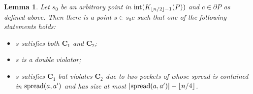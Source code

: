 \documentclass[12pt]{article}
\newcommand{\spread}{{\rm spread}}
\newcommand{\floor}[1]{{\lfloor #1 \rfloor}}
\newtheorem{lemma}{Lemma}
\begin{document}
\begin{lemma}\label{lem:line}
Let $s_0$ be an arbitrary point in ${\rm int}(K_{\floor{n/2}-1}(P))$ and
$c \in \partial P$ as defined above.
Then there is a point $s\in s_0c$ such that one of the following statements holds:
\begin{itemize}
\item[$\bullet$] $s$ satisfies both $\mathbf{C}_1$ and $\mathbf{C}_2$;
\item[$\bullet$] $s$ is a double violator;
\item[$\bullet$] $s$ satisfies $\mathbf{C}_1$ but violates $\mathbf{C}_2$ due
                  to two pockets of whose spread is contained in $\spread(a,a')$
                  and has size at most $|\spread(a,a')|-\floor{n/4}$.
\end{itemize}
\end{lemma}
\end{document}
